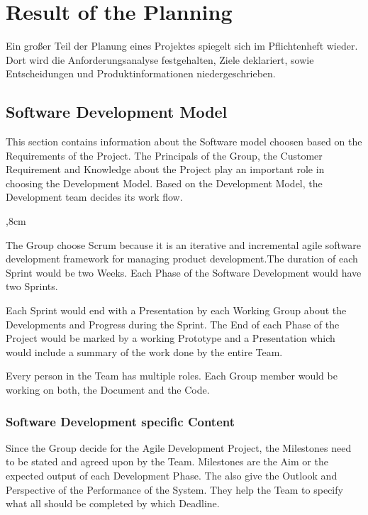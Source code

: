 \section{Result of the Planning}

Ein großer Teil der Planung eines Projektes spiegelt sich im Pflichtenheft wieder. Dort wird die Anforderungsanalyse festgehalten, Ziele deklariert, sowie Entscheidungen und Produktinformationen niedergeschrieben.

\subsection{Software Development Model}

This section contains information about the Software model choosen based on the Requirements of the Project.
The Principals of the Group, the Customer Requirement and Knowledge about the Project play an important role in choosing the Development Model. Based on the Development Model, the Development team decides its work flow. 

\begin{description}
	,8cm
	\item[Agile Development Model: SCRUM] The Group choose Scrum because it is an iterative and incremental agile software development framework for managing product development.The duration of each Sprint would be two Weeks. Each Phase of the Software Development would have two Sprints. 
	
	Each Sprint would end with a Presentation by each Working Group about the Developments and Progress during the Sprint. The End of each Phase of the Project would be marked by a working Prototype and a Presentation which would include a summary of the work done by the entire Team. 
	
	\item[Projects specific Adaptation to the Model:] Every person in the Team has multiple roles. Each Group member would be working on both, the Document and the Code.
\end{description} 

\subsubsection{Software Development specific Content}
Since the Group decide for the Agile Development Project, the Milestones need to be stated and agreed upon by the Team. Milestones are the Aim or the expected output of each Development Phase. The also give the Outlook and Perspective of the Performance of the System. They help the Team to specify what all should be completed by which Deadline.


